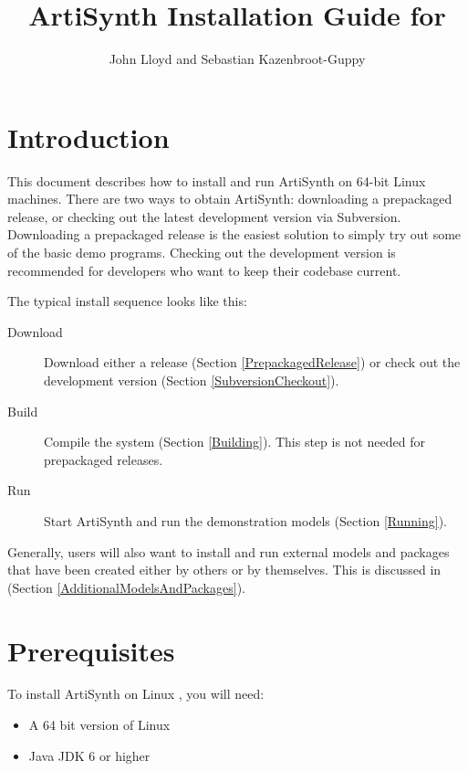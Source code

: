 \documentclass{article}
\title{ArtiSynth Installation Guide for \SYSTEM}
\author{John Lloyd and Sebastian Kazenbroot-Guppy}
\date{}
\def\FULLSYSTEM{64-bit Linux }
\def\SYSTEM{Linux }
\begin{document}
\maketitle

\iflatexml{\large\today}\fi


\tableofcontents

\section{Introduction}

This document describes how to install and run ArtiSynth on \FULLSYSTEM
machines. There are two ways to obtain ArtiSynth: downloading
a prepackaged release, or checking out the latest development version
via Subversion. Downloading a prepackaged release is the easiest
solution to simply try out some of the basic demo programs. Checking
out the development version is recommended for developers who want to
keep their codebase current.

The typical install sequence looks like this:

\begin{description}

\item[Download]
Download either a release (Section \ref{PrepackagedRelease}) or 
check out the development version (Section \ref{SubversionCheckout}).

\item[Build]
Compile the system (Section \ref{Building}). This
step is not needed for prepackaged releases.

\item[Run] 
Start ArtiSynth and run the demonstration models (Section \ref{Running}).

\end{description}

Generally, users will also want to install and run external models and
packages that have been created either by others or by themselves.
This is discussed in (Section \ref{AdditionalModelsAndPackages}).

\section{Prerequisites}

To install ArtiSynth on \SYSTEM, you will need:

\begin{itemize}

\item A 64 bit version of \SYSTEM

\item Java JDK 6 or higher

\end{itemize}
\end{document}

